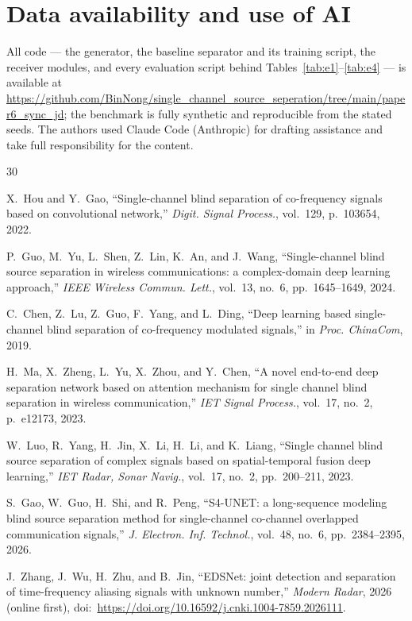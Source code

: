 \documentclass[journal]{IEEEtran}
\begin{document}
\section*{Data availability and use of AI}
All code --- the generator, the baseline separator and its
training script, the receiver modules, and every evaluation script
behind Tables~\ref{tab:e1}--\ref{tab:e4} --- is available at
\url{https://github.com/BinNong/single_channel_source_seperation/tree/main/paper6_sync_jd};
the benchmark is fully synthetic and reproducible from
the stated seeds. The authors used Claude Code (Anthropic) for drafting
assistance and take full responsibility for the content.
\begin{thebibliography}{30}\scriptsize\setlength{\itemsep}{-1pt}

X.~Hou and Y.~Gao,
``Single-channel blind separation of co-frequency signals based on
convolutional network,''
\emph{Digit. Signal Process.}, vol.~129, p.~103654, 2022.

P.~Guo, M.~Yu, L.~Shen, Z.~Lin, K.~An, and J.~Wang,
``Single-channel blind source separation in wireless communications: a
complex-domain deep learning approach,''
\emph{IEEE Wireless Commun. Lett.}, vol.~13, no.~6, pp.~1645--1649,
2024.

C.~Chen, Z.~Lu, Z.~Guo, F.~Yang, and L.~Ding,
``Deep learning based single-channel blind separation of co-frequency
modulated signals,''
in \emph{Proc. ChinaCom}, 2019.

H.~Ma, X.~Zheng, L.~Yu, X.~Zhou, and Y.~Chen,
``A novel end-to-end deep separation network based on attention
mechanism for single channel blind separation in wireless
communication,''
\emph{IET Signal Process.}, vol.~17, no.~2, p.~e12173, 2023.

W.~Luo, R.~Yang, H.~Jin, X.~Li, H.~Li, and K.~Liang,
``Single channel blind source separation of complex signals based on
spatial-temporal fusion deep learning,''
\emph{IET Radar, Sonar Navig.}, vol.~17, no.~2, pp.~200--211, 2023.

S.~Gao, W.~Guo, H.~Shi, and R.~Peng,
``S4-UNET: a long-sequence modeling blind source separation method for
single-channel co-channel overlapped communication signals,''
\emph{J. Electron. Inf. Technol.}, vol.~48, no.~6, pp.~2384--2395,
2026.

J.~Zhang, J.~Wu, H.~Zhu, and B.~Jin,
``EDSNet: joint detection and separation of time-frequency aliasing
signals with unknown number,''
\emph{Modern Radar}, 2026 (online first),
doi:~\url{https://doi.org/10.16592/j.cnki.1004-7859.2026111}.


\end{thebibliography}
\end{document}
